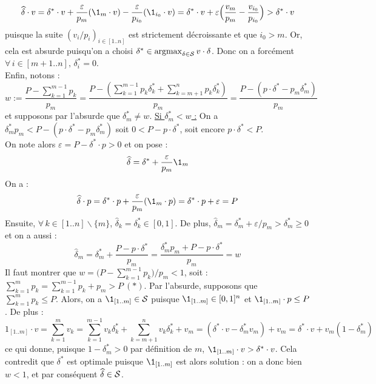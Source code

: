 \begin{Preuve}
					\[
						\widehat{\delta} \dotp v = \displaystyle \delta^* \dotp v + \frac{\varepsilon}{p_m} (\1_m \dotp v) - \frac{\varepsilon}{p_{i_0}} {(\1_{i_0} \dotp v)} = \displaystyle \delta^* \dotp v + {\varepsilon} \Big( {\frac{v_m}{p_m} - \frac{v_{i_0}}{p_{i_0}}} \Big) > \delta^* \dotp v
					\]
				puisque la suite \((v_i/p_i)_{i\in[1..n]}\) est strictement décroissante et que \(i_0 > m\). Or, cela est absurde puisqu'on a choisi \( \delta^* \in \argmax_{\delta\in\cal{S}} v \dotp \delta \). \nt
				Donc on a forcément \( \forall \, i \in [m+1..n], \, \delta^*_i = 0 \). \\[3mm]
				\iii Enfin, notons :
					\[
						w := \displaystyle \frac{P - \displaystyle\sum\nolimits_{k=1}^{m-1} p_k}{p_m} = \frac{P - (\displaystyle\sum\nolimits_{k=1}^{m-1} p_k\delta^*_k + \displaystyle\sum\nolimits_{k=m+1}^n p_k \delta^*_k)}{p_m} = \frac{P - (p\cdot \delta^* - p_m\delta^*_m)}{p_m}
					\]
				et supposons par l'absurde que \(\delta^*_m \neq w\). \nt \eqskip{3mm}
				\underline{\bdot Si \(\delta^*_m < w\) :} On a \(\delta^*_m p_m < P - (p\cdot \delta^* - p_m \delta^*_m)\) soit \(0 < P - p\cdot \delta^*\), soit encore \(p\cdot \delta^* < P\). \\
				On note alors \(\varepsilon = P - \delta^* \cdot p > 0\) et on pose :
					\[
						\widehat{\delta} = \delta^* + \frac{\varepsilon}{p_m}\1_m
					\]
				On a : \eqskip{2mm} 
				\[
				\widehat{\delta} \cdot p = \delta^* \cdot p + \frac{\varepsilon}{p_m}(\1_m\cdot p) = \delta^*\cdot p + \varepsilon = P
				\]
				Ensuite, \(\forall\, k\in[1..n]\backslash\{m\}\), \(\widehat{\delta}_k = \delta^*_k \in [0,1]\).	De plus, \(\widehat{\delta}_m = \delta^*_m + \varepsilon/p_m > \delta^*_m \geq 0\) et on a aussi :
					\[
						\widehat{\delta}_m = \delta^*_m + \frac{P - p \cdot \delta^*}{p_m} = \frac{\delta^*_m p_m + P - p\cdot \delta^*}{p_m} = w
					\]
				Il faut montrer que \(w = \displaystyle \big({P - \displaystyle\sum\nolimits_{k=1}^{m-1} p_k}\big)/{p_m} < 1\), soit :
					\(\displaystyle\sum\nolimits_{k=1}^m p_k = \displaystyle\sum\nolimits_{k=1}^{m-1} p_k + p_m > P \ \bm{(*)}\).
				Par l'absurde, supposons que \(\displaystyle\sum\nolimits_{k=1}^m p_k \leq P\).	Alors, on a \(\1_{[1..m]} \in \cal{S}\) puisque \(\1_{[1..m]} \in [0,1]^n\) et \(\1_{[1..m]} \cdot p \leq P\). De plus :
					\[
						1_{[1..m]}\cdot v = \sum_{k=1}^m v_k = \sum_{k=1}^{m-1} v_k \delta^*_k + \sum_{k=m+1}^n v_k \delta^*_k + v_m = (\delta^* \cdot v - \delta^*_m v_m) + v_m = \delta^* \cdot v + v_m(1-\delta^*_m)
					\]
				ce qui donne, puisque \(1-\delta^*_m > 0\) par définition de \(m\), \(\1_{[1..m]} \cdot v > \delta^* \cdot v\). Cela contredit que \(\delta^*\) est optimale puisque \(\1_{[1..m]}\) est alors solution : on a donc bien \(w < 1\), et par conséquent \(\widehat{\delta} \in \cal{S}\). \nt

\end{Preuve}
